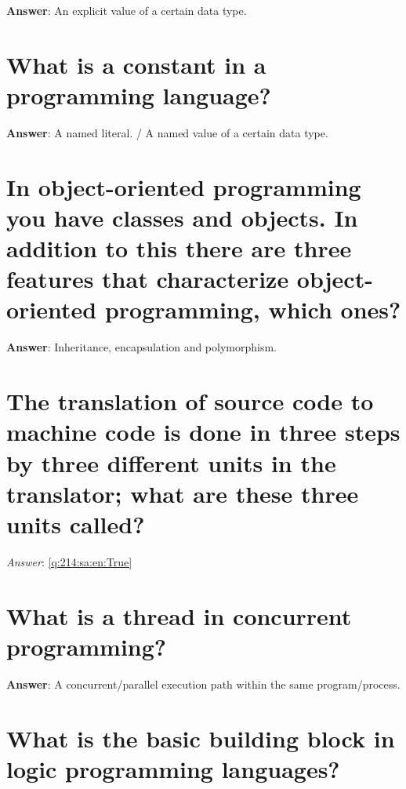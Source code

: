 \documentclass[a4paper,11pt,oneside]{book}
\begin{document}
\begin{sloppypar}
\textbf{Answer}: An explicit value of a certain data type.



\section{What is a constant in a programming language?}

\label{q:212:sa:en:True}

\textbf{Answer}: A named literal. / A named value of a certain data type.



\section{In object-oriented programming you have classes and objects. In addition to this there are three features that characterize object-oriented programming, which ones?}

\label{q:213:sa:en:True}

\textbf{Answer}: Inheritance, encapsulation and polymorphism.



\section{The translation of source code to machine code is done in three steps by three different units in the translator; what are these three units called?}

\label{q:214:sa:en:True}

\vspace{2cm}

\noindent\makebox[\textwidth]{\hrulefill}

\vspace{1cm}

\textit{Answer}: \autoref{q:214:sa:en:True}



\section{What is a thread in concurrent programming?}

\label{q:215:sa:en:True}

\textbf{Answer}: A concurrent/parallel execution path within the same program/process.



\section{What is the basic building block in logic programming languages?}


\end{sloppypar}
\end{document}
